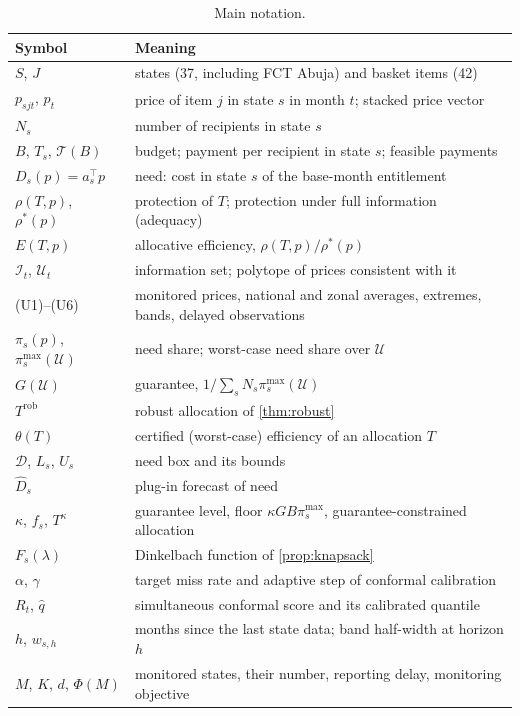 \documentclass[preprint,12pt,number]{elsarticle}%
\theoremstyle{definition}
\theoremstyle{remark}
\newcommand{\U}{\mathcal{U}}
\newcommand{\I}{\mathcal{I}}
\newcommand{\pimax}{\pi^{\max}}
\begin{document}
\begin{table}[h]
\centering
\caption{Main notation.}\label{tab:notation}
\small
\begin{tabular}{ll}
\toprule
Symbol & Meaning\\
\midrule
$S$, $J$ & states (37, including FCT Abuja) and basket items (42)\\
$p_{sjt}$, $p_t$ & price of item $j$ in state $s$ in month $t$; stacked price vector\\
$N_s$ & number of recipients in state $s$\\
$B$, $T_s$, $\mathcal T(B)$ & budget; payment per recipient in state $s$; feasible payments\\
$D_s(p)=a_s^{\top}p$ & need: cost in state $s$ of the base-month entitlement\\
$\rho(T,p)$, $\rho^*(p)$ & protection of $T$; protection under full information (adequacy)\\
$E(T,p)$ & allocative efficiency, $\rho(T,p)/\rho^*(p)$\\
$\I_t$, $\U_t$ & information set; polytope of prices consistent with it\\
(U1)--(U6) & monitored prices, national and zonal averages, extremes, bands, delayed observations\\
$\pi_s(p)$, $\pimax_s(\U)$ & need share; worst-case need share over $\U$\\
$G(\U)$ & guarantee, $1/\sum_sN_s\pimax_s(\U)$\\
$T^{\mathrm{rob}}$ & robust allocation of \cref{thm:robust}\\
$\theta(T)$ & certified (worst-case) efficiency of an allocation $T$\\
$\mathcal D$, $L_s$, $U_s$ & need box and its bounds\\
$\hat D_s$ & plug-in forecast of need\\
$\kappa$, $f_s$, $T^\kappa$ & guarantee level, floor $\kappa GB\pimax_s$, guarantee-constrained allocation\\
$F_s(\lambda)$ & Dinkelbach function of \cref{prop:knapsack}\\
$\alpha$, $\gamma$ & target miss rate and adaptive step of conformal calibration\\
$R_t$, $\hat q$ & simultaneous conformal score and its calibrated quantile\\
$h$, $w_{s,h}$ & months since the last state data; band half-width at horizon $h$\\
$M$, $K$, $d$, $\Phi(M)$ & monitored states, their number, reporting delay, monitoring objective\\
\bottomrule
\end{tabular}
\end{table}


\end{document}
